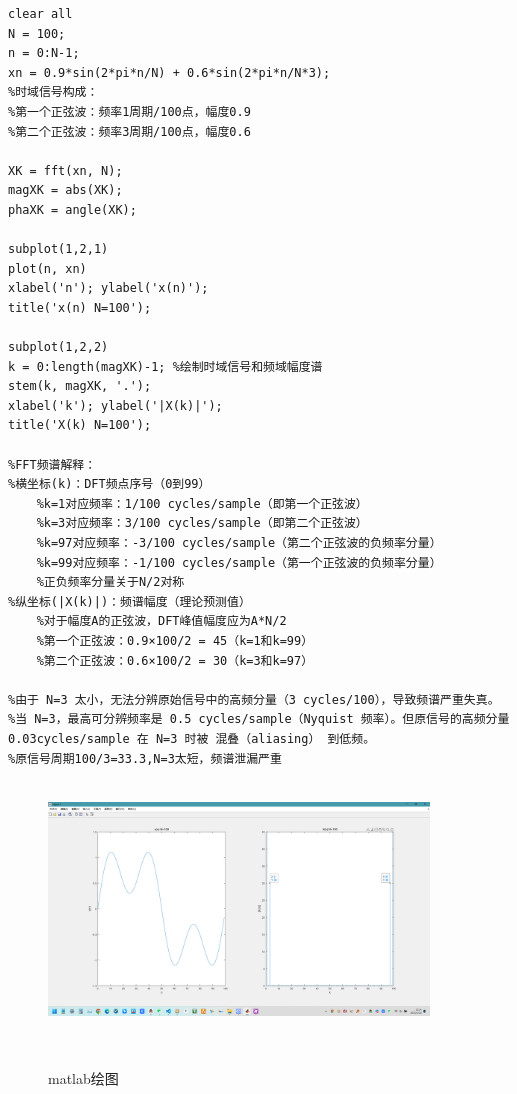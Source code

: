 \documentclass[12pt,hyperref,a4paper,UTF8]{ctexart}
\begin{document}
\begin{lstlisting}[style=matlab, caption={ MATLAB实现代码}]
clear all
N = 100;
n = 0:N-1;
xn = 0.9*sin(2*pi*n/N) + 0.6*sin(2*pi*n/N*3);
%时域信号构成：
%第一个正弦波：频率1周期/100点，幅度0.9
%第二个正弦波：频率3周期/100点，幅度0.6

XK = fft(xn, N);
magXK = abs(XK);
phaXK = angle(XK);

subplot(1,2,1)
plot(n, xn)
xlabel('n'); ylabel('x(n)');
title('x(n) N=100');

subplot(1,2,2)
k = 0:length(magXK)-1; %绘制时域信号和频域幅度谱
stem(k, magXK, '.'); 
xlabel('k'); ylabel('|X(k)|');
title('X(k) N=100');

%FFT频谱解释：
%横坐标(k)：DFT频点序号（0到99）
    %k=1对应频率：1/100 cycles/sample（即第一个正弦波）
    %k=3对应频率：3/100 cycles/sample（即第二个正弦波）
    %k=97对应频率：-3/100 cycles/sample（第二个正弦波的负频率分量）
    %k=99对应频率：-1/100 cycles/sample（第一个正弦波的负频率分量）    
    %正负频率分量关于N/2对称
%纵坐标(|X(k)|)：频谱幅度（理论预测值）
    %对于幅度A的正弦波，DFT峰值幅度应为A*N/2
    %第一个正弦波：0.9×100/2 = 45（k=1和k=99）
    %第二个正弦波：0.6×100/2 = 30（k=3和k=97）

%由于 N=3 太小，无法分辨原始信号中的高频分量（3 cycles/100），导致频谱严重失真。
%当 N=3，最高可分辨频率是 0.5 cycles/sample（Nyquist 频率）。但原信号的高频分量0.03cycles/sample 在 N=3 时被 混叠（aliasing） 到低频。
%原信号周期100/3=33.3,N=3太短，频谱泄漏严重
\end{lstlisting}



\begin{figure}[H] %
        \centering
        \includegraphics[width=0.9\textwidth]{figures/302.png} %
        \caption{matlab绘图} %
        \label{fig:example} %
\end{figure}
\end{document}
